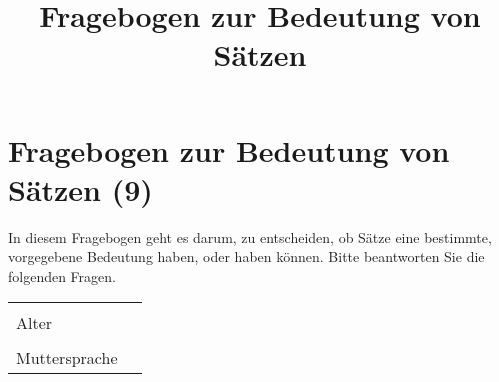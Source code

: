 \documentclass[a4paper, 8pt]{article}
\title{Fragebogen zur Bedeutung von Sätzen}
\begin{document}
\section*{Fragebogen zur Bedeutung von Sätzen (9)}

In diesem Fragebogen geht es darum, zu entscheiden, ob Sätze eine bestimmte, vorgegebene Bedeutung haben, oder haben können. Bitte beantworten Sie die folgenden Fragen.


\begin{tabular}{|l|p{5cm}|}
\hline
& \\
Alter & \\
\hline
& \\
Muttersprache & \\
\hline
\end{tabular}
\end{document}
